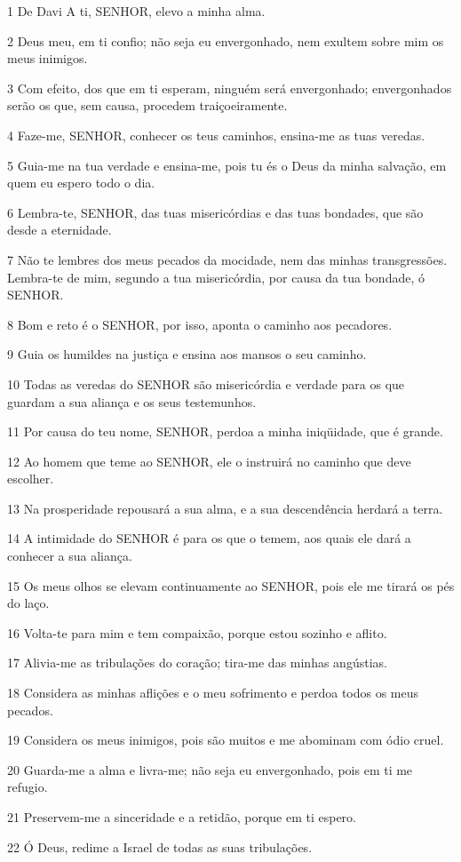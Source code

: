 \par 1 De Davi A ti, SENHOR, elevo a minha alma.
\par 2 Deus meu, em ti confio; não seja eu envergonhado, nem exultem sobre mim os meus inimigos.
\par 3 Com efeito, dos que em ti esperam, ninguém será envergonhado; envergonhados serão os que, sem causa, procedem traiçoeiramente.
\par 4 Faze-me, SENHOR, conhecer os teus caminhos, ensina-me as tuas veredas.
\par 5 Guia-me na tua verdade e ensina-me, pois tu és o Deus da minha salvação, em quem eu espero todo o dia.
\par 6 Lembra-te, SENHOR, das tuas misericórdias e das tuas bondades, que são desde a eternidade.
\par 7 Não te lembres dos meus pecados da mocidade, nem das minhas transgressões. Lembra-te de mim, segundo a tua misericórdia, por causa da tua bondade, ó SENHOR.
\par 8 Bom e reto é o SENHOR, por isso, aponta o caminho aos pecadores.
\par 9 Guia os humildes na justiça e ensina aos mansos o seu caminho.
\par 10 Todas as veredas do SENHOR são misericórdia e verdade para os que guardam a sua aliança e os seus testemunhos.
\par 11 Por causa do teu nome, SENHOR, perdoa a minha iniqüidade, que é grande.
\par 12 Ao homem que teme ao SENHOR, ele o instruirá no caminho que deve escolher.
\par 13 Na prosperidade repousará a sua alma, e a sua descendência herdará a terra.
\par 14 A intimidade do SENHOR é para os que o temem, aos quais ele dará a conhecer a sua aliança.
\par 15 Os meus olhos se elevam continuamente ao SENHOR, pois ele me tirará os pés do laço.
\par 16 Volta-te para mim e tem compaixão, porque estou sozinho e aflito.
\par 17 Alivia-me as tribulações do coração; tira-me das minhas angústias.
\par 18 Considera as minhas aflições e o meu sofrimento e perdoa todos os meus pecados.
\par 19 Considera os meus inimigos, pois são muitos e me abominam com ódio cruel.
\par 20 Guarda-me a alma e livra-me; não seja eu envergonhado, pois em ti me refugio.
\par 21 Preservem-me a sinceridade e a retidão, porque em ti espero.
\par 22 Ó Deus, redime a Israel de todas as suas tribulações.

